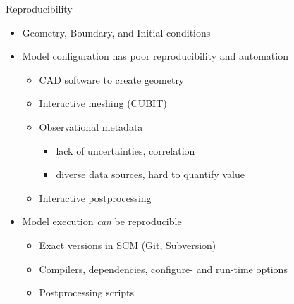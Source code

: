 \documentclass{beamer}
\begin{document}
\begin{frame}{Reproducibility}
  \begin{itemize}
  \item Geometry, Boundary, and Initial conditions
  \item Model configuration has poor reproducibility and automation
    \begin{itemize}
    \item CAD software to create geometry
    \item Interactive meshing (CUBIT)
    \item Observational metadata
      \begin{itemize}
      \item lack of uncertainties, correlation
      \item diverse data sources, hard to quantify value
      \end{itemize}
    \item Interactive postprocessing
    \end{itemize}
  \item Model execution \emph{can} be reproducible
    \begin{itemize}
    \item Exact versions in SCM (Git, Subversion)
    \item Compilers, dependencies, configure- and run-time options
    \item Postprocessing scripts
    \end{itemize}
  \end{itemize}
\end{frame}
\end{document}
